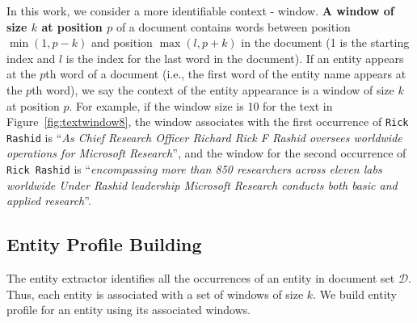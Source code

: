 \documentclass{sig-alternate}
\theoremstyle{definition}
\begin{document}
In this work, we consider a more identifiable context - window. {\bf A window of size $k$ at position $p$} of a document contains words between position $\min(1, p - k)$ and position $\max(l, p + k)$ in the document (1 is the starting index and $l$ is the index for the last word in the document). If an entity appears at the $p$th word of a document (i.e., the first word of the entity name appears at the $p$th word), we say the context of the entity appearance is a window of size $k$ at position $p$. For example, if the window size is 10 for the text in Figure~\ref{fig:textwindow8}, the window associates with the first occurrence of {\tt Rick Rashid} is ``{\em As Chief Research Officer Richard Rick F Rashid oversees worldwide operations for Microsoft Research}'', and the window for the second occurrence of {\tt Rick Rashid} is ``{\em encompassing more than 850 researchers across eleven labs worldwide Under Rashid leadership Microsoft Research conducts both basic and applied research}''.

\subsection{Entity Profile Building}\label{sec:buildProfile}
The entity extractor identifies all the occurrences of an entity in document set $\mathcal{D}$. Thus, each entity is associated with a set of windows of size $k$. We build entity profile for an entity using its associated windows.
\end{document}
